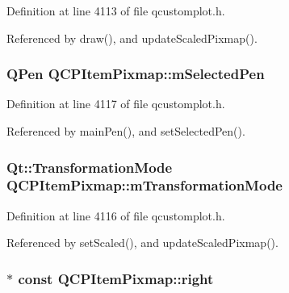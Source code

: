 Definition at line 4113 of file qcustomplot.\+h.



Referenced by draw(), and update\+Scaled\+Pixmap().

\hypertarget{class_q_c_p_item_pixmap_a0949e5bb6a261fc4e9668e28e2effcfa}{}
\subsubsection[{m\+Selected\+Pen}]{\setlength{\rightskip}{0pt plus 5cm}Q\+Pen Q\+C\+P\+Item\+Pixmap\+::m\+Selected\+Pen\hspace{0.3cm}{\ttfamily [protected]}}\label{class_q_c_p_item_pixmap_a0949e5bb6a261fc4e9668e28e2effcfa}


Definition at line 4117 of file qcustomplot.\+h.



Referenced by main\+Pen(), and set\+Selected\+Pen().

\hypertarget{class_q_c_p_item_pixmap_ac9ecad3b9842363754e32eda2cf821bd}{}
\subsubsection[{m\+Transformation\+Mode}]{\setlength{\rightskip}{0pt plus 5cm}Qt\+::\+Transformation\+Mode Q\+C\+P\+Item\+Pixmap\+::m\+Transformation\+Mode\hspace{0.3cm}{\ttfamily [protected]}}\label{class_q_c_p_item_pixmap_ac9ecad3b9842363754e32eda2cf821bd}


Definition at line 4116 of file qcustomplot.\+h.



Referenced by set\+Scaled(), and update\+Scaled\+Pixmap().

\hypertarget{class_q_c_p_item_pixmap_ac9c0fd231f9e285765978a05d13f8280}{}
\subsubsection[{right}]{$\ast$ const Q\+C\+P\+Item\+Pixmap\+::right}\label{class_q_c_p_item_pixmap_ac9c0fd231f9e285765978a05d13f8280}


